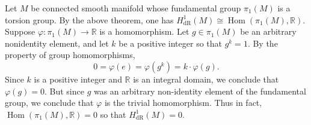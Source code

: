 \documentclass{article}
\begin{document}
	Let $M$ be  connected smooth manifold whose fundamental group $\pi_{1}(M)$ is a torsion group. By the above theorem, one has $H^{1}_{\text{dR}}(M) \cong \operatorname{Hom}(\pi_{1}(M), \mathbb{R})$. Suppose $\varphi: \pi_{1}(M) \to \mathbb{R}$ is a homomorphism. Let $g \in \pi_{1}(M)$ be an arbitrary nonidentity element, and let $k$ be a positive integer so that $g^{k} = 1$. By the property of group homomorphisms, 
	\begin{equation*}
		0 = \varphi(e) = \varphi(g^{k}) = k \cdot \varphi(g). 
	\end{equation*}
	Since $k$ is a positive integer and $\mathbb{R}$ is an integral domain, we conclude that $\varphi(g) = 0$. But since $g$ was an arbitrary non-identity element of the fundamental group, we conclude that $\varphi$ is the trivial homomorphism. Thus in fact, $\operatorname{Hom}(\pi_{1}(M), \mathbb{R}) = 0$ so that $H^{1}_{\text{dR}}(M) = 0$. 
	
\end{document}
